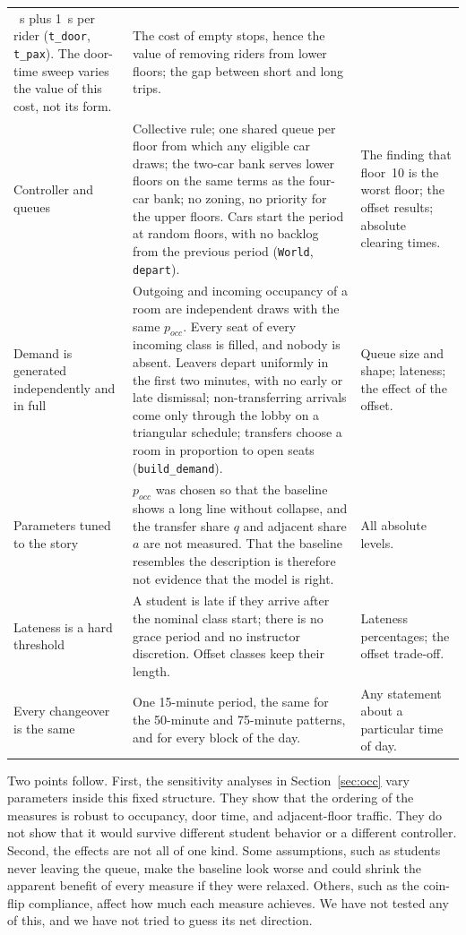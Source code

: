 {\begin{longtable}{>{\raggedright\arraybackslash}p{1.45in}>{\raggedright\arraybackslash}p{2.6in}>{\raggedright\arraybackslash}p{1.9in}}
8~s plus 1~s per rider (\texttt{t\_door}, \texttt{t\_pax}). The door-time sweep varies the value of this cost, not its form. &
The cost of empty stops, hence the value of removing riders from lower floors; the gap between short and long trips.\\
Controller and queues &
Collective rule; one shared queue per floor from which any eligible car draws; the two-car bank serves lower floors on
the same terms as the four-car bank; no zoning, no priority for the upper floors. Cars start the period at random
floors, with no backlog from the previous period (\texttt{World}, \texttt{depart}). &
The finding that floor~10 is the worst floor; the offset results; absolute clearing times.\\
Demand is generated independently and in full &
Outgoing and incoming occupancy of a room are independent draws with the same $p_{occ}$. Every seat of every incoming
class is filled, and nobody is absent. Leavers depart uniformly in the first two minutes, with no early or late
dismissal; non-transferring arrivals come only through the lobby on a triangular schedule; transfers choose a room in
proportion to open seats (\texttt{build\_demand}). &
Queue size and shape; lateness; the effect of the offset.\\
Parameters tuned to the story &
$p_{occ}$ was chosen so that the baseline shows a long line without collapse, and the transfer share $q$ and
adjacent share $a$ are not measured. That the baseline resembles the description is therefore not evidence that the
model is right. &
All absolute levels.\\
Lateness is a hard threshold &
A student is late if they arrive after the nominal class start; there is no grace period and no instructor discretion.
Offset classes keep their length. &
Lateness percentages; the offset trade-off.\\
Every changeover is the same &
One 15-minute period, the same for the 50-minute and 75-minute patterns, and for every block of the day. &
Any statement about a particular time of day.\\
\end{longtable}
}

Two points follow. First, the sensitivity analyses in Section~\ref{sec:occ} vary parameters inside this fixed
structure. They show that the ordering of the measures is robust to occupancy, door time, and adjacent-floor
traffic. They do not show that it would survive different student behavior or a different controller. Second, the
effects are not all of one kind. Some assumptions, such as students never leaving the queue, make the baseline look
worse and could shrink the apparent benefit of every measure if they were relaxed. Others, such as the
coin-flip compliance, affect how much each measure achieves. We have not tested any of this, and we have not
tried to guess its net direction.

